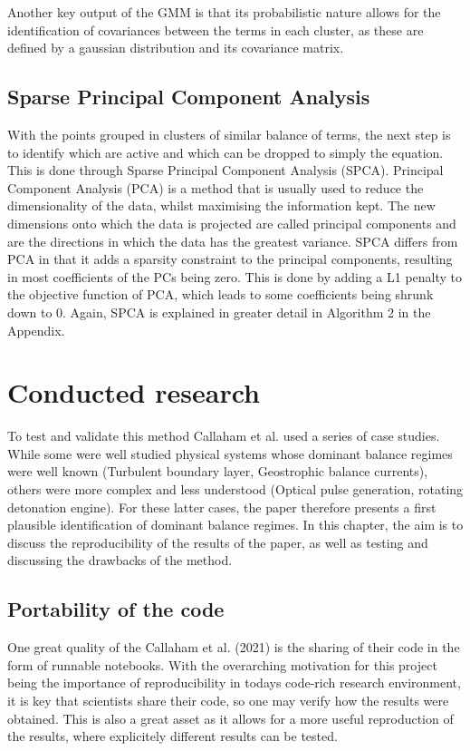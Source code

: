 \documentclass[12pt]{report} %
\begin{document}
Another key output of the GMM is that its probabilistic nature allows for the identification of covariances between the terms in each cluster, as these are defined by a gaussian distribution and its covariance matrix.


\section{Sparse Principal Component Analysis}

With the points grouped in clusters of similar balance of terms, the next step is to identify which are active and which can be dropped to simply the equation. This is done through Sparse Principal Component Analysis (SPCA). Principal Component Analysis (PCA) is a method that is usually used to reduce the dimensionality of the data, whilst maximising the information kept. The new dimensions onto which the data is projected are called principal components and are the directions in which the data has the greatest variance\cite{lever2017principal}. SPCA differs from PCA in that it adds a sparsity constraint to the principal components, resulting in most coefficients of the PCs being zero. This is done by adding a L1 penalty to the objective function of PCA, which leads to some coefficients being shrunk down to 0\cite{zou2006sparse}. Again, SPCA is explained in greater detail in Algorithm 2 in the Appendix.


\chapter{Conducted research}

To test and validate this method Callaham et al. used a series of case studies\cite{callaham2021learning}. While some were well studied physical systems whose dominant balance regimes were well known (Turbulent boundary layer, Geostrophic balance currents), others were more complex and less understood (Optical pulse generation, rotating detonation engine). For these latter cases, the paper therefore presents a first plausible identification of dominant balance regimes. In this chapter, the aim is to discuss the reproducibility of the results of the paper, as well as testing and discussing the drawbacks of the method.

\section{Portability of the code}

One great quality of the Callaham et al. (2021)\cite{callaham2021learning} is the sharing of their code in the form of runnable notebooks. With the overarching motivation for this project being the importance of reproducibility in todays code-rich research environment, it is key that scientists share their code, so one may verify how the results were obtained. This is also a great asset as it allows for a more useful reproduction of the results, where explicitely different results can be tested.
\end{document}
